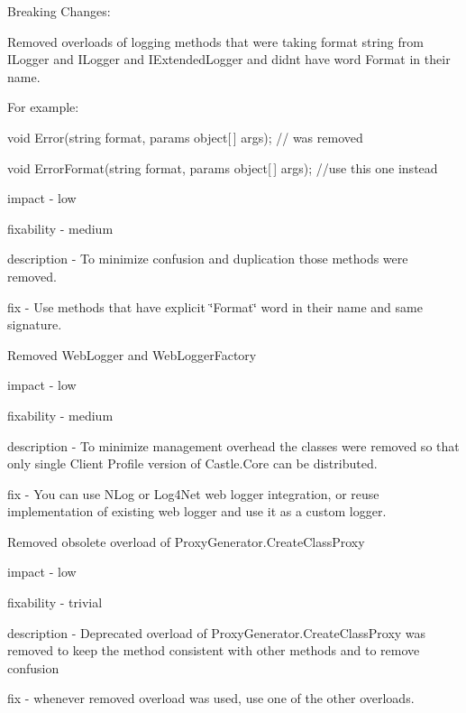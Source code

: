 Breaking Changes\+:
\begin{DoxyItemize}
\item Removed overloads of logging methods that were taking format string from I\+Logger and I\+Logger and I\+Extended\+Logger and didn\textquotesingle{}t have word Format in their name.
\begin{DoxyItemize}
\item For example\+:
\begin{DoxyItemize}
\item void Error(string format, params object[$\,$] args); // was removed
\item void Error\+Format(string format, params object[$\,$] args); //use this one instead
\end{DoxyItemize}
\item impact -\/ low
\item fixability -\/ medium
\item description -\/ To minimize confusion and duplication those methods were removed.
\item fix -\/ Use methods that have explicit \char`\"{}\+Format\char`\"{} word in their name and same signature.
\end{DoxyItemize}
\item Removed Web\+Logger and Web\+Logger\+Factory
\begin{DoxyItemize}
\item impact -\/ low
\item fixability -\/ medium
\item description -\/ To minimize management overhead the classes were removed so that only single Client Profile version of Castle.\+Core can be distributed.
\item fix -\/ You can use N\+Log or Log4\+Net web logger integration, or reuse implementation of existing web logger and use it as a custom logger.
\end{DoxyItemize}
\item Removed obsolete overload of Proxy\+Generator.\+Create\+Class\+Proxy
\begin{DoxyItemize}
\item impact -\/ low
\item fixability -\/ trivial
\item description -\/ Deprecated overload of Proxy\+Generator.\+Create\+Class\+Proxy was removed to keep the method consistent with other methods and to remove confusion
\item fix -\/ whenever removed overload was used, use one of the other overloads.

\end{DoxyItemize}
\end{DoxyItemize}
